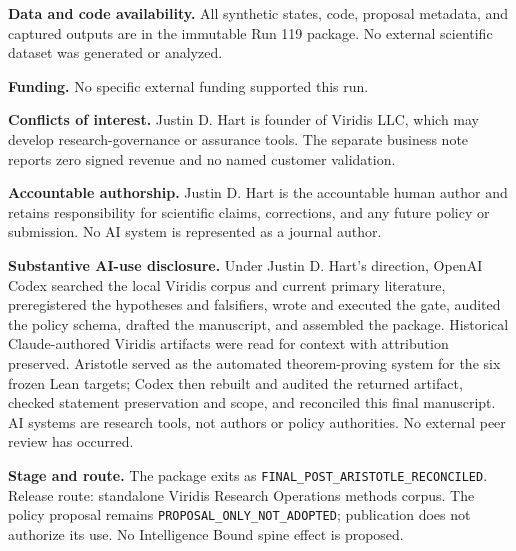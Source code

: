 \documentclass[10pt]{article}
\begin{document}
\textbf{Data and code availability.} All synthetic states, code, proposal
metadata, and captured outputs are in the immutable Run 119 package.  No
external scientific dataset was generated or analyzed.

\textbf{Funding.} No specific external funding supported this run.

\textbf{Conflicts of interest.} Justin D. Hart is founder of Viridis LLC,
which may develop research-governance or assurance tools.  The separate
business note reports zero signed revenue and no named customer validation.

\textbf{Accountable authorship.} Justin D. Hart is the accountable human
author and retains responsibility for scientific claims, corrections, and any
future policy or submission.  No AI system is represented as a journal author.

\textbf{Substantive AI-use disclosure.} Under Justin D. Hart's direction,
OpenAI Codex searched the local Viridis corpus and current primary literature,
preregistered the hypotheses and falsifiers, wrote and executed the gate,
audited the policy schema, drafted the manuscript, and assembled the package.
Historical Claude-authored Viridis artifacts were read for context with
attribution preserved.  Aristotle served as the automated theorem-proving
system for the six frozen Lean targets; Codex then rebuilt and audited the
returned artifact, checked statement preservation and scope, and reconciled
this final manuscript.  AI systems are research tools, not authors or policy
authorities.  No external peer review has occurred.

\textbf{Stage and route.} The package exits as
\texttt{FINAL\_POST\_ARISTOTLE\_RECONCILED}.  Release route: standalone
Viridis Research Operations methods corpus.  The policy proposal remains
\texttt{PROPOSAL\_ONLY\_NOT\_ADOPTED}; publication does not authorize its use.
No Intelligence Bound spine effect is proposed.
\end{document}
